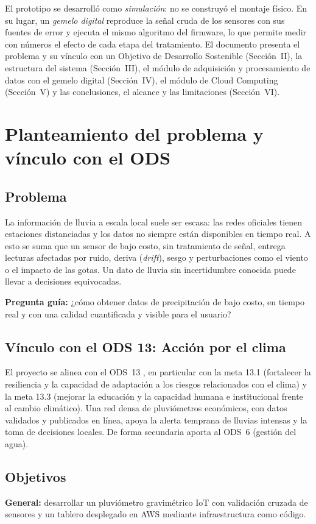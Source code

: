 \documentclass[10pt,twocolumn,letterpaper]{article}
\begin{document}
El prototipo se desarrolló como \emph{simulación}: no se construyó el montaje físico. En su lugar, un \emph{gemelo digital} reproduce la señal cruda de los sensores con sus fuentes de error y ejecuta el mismo algoritmo del firmware, lo que permite medir con números el efecto de cada etapa del tratamiento. El documento presenta el problema y su vínculo con un Objetivo de Desarrollo Sostenible (Sección~II), la estructura del sistema (Sección~III), el módulo de adquisición y procesamiento de datos con el gemelo digital (Sección~IV), el módulo de Cloud Computing (Sección~V) y las conclusiones, el alcance y las limitaciones (Sección~VI).

\section{Planteamiento del problema y vínculo con el ODS}
\subsection{Problema}
La información de lluvia a escala local suele ser escasa: las redes oficiales tienen estaciones distanciadas y los datos no siempre están disponibles en tiempo real. A esto se suma que un sensor de bajo costo, sin tratamiento de señal, entrega lecturas afectadas por ruido, deriva (\emph{drift}), sesgo y perturbaciones como el viento o el impacto de las gotas. Un dato de lluvia sin incertidumbre conocida puede llevar a decisiones equivocadas.

\noindent\textbf{Pregunta guía:} ¿cómo obtener datos de precipitación de bajo costo, en tiempo real y con una calidad cuantificada y visible para el usuario?

\subsection{Vínculo con el ODS 13: Acción por el clima}
El proyecto se alinea con el ODS~13 \cite{ods13}, en particular con la meta 13.1 (fortalecer la resiliencia y la capacidad de adaptación a los riesgos relacionados con el clima) y la meta 13.3 (mejorar la educación y la capacidad humana e institucional frente al cambio climático). Una red densa de pluviómetros económicos, con datos validados y publicados en línea, apoya la alerta temprana de lluvias intensas y la toma de decisiones locales. De forma secundaria aporta al ODS~6 (gestión del agua).

\subsection{Objetivos}
\textbf{General:} desarrollar un pluviómetro gravimétrico IoT con validación cruzada de sensores y un tablero desplegado en AWS mediante infraestructura como código.
\end{document}
